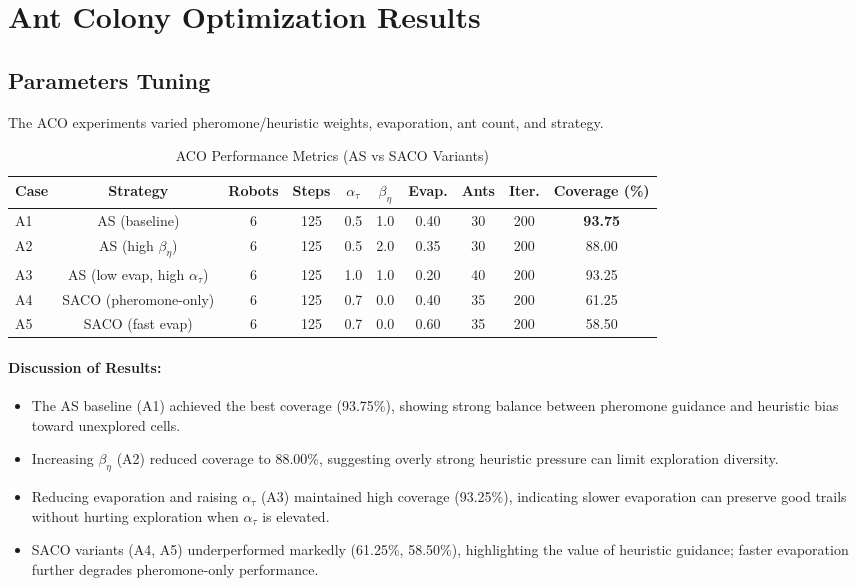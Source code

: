 \section{Ant Colony Optimization Results}

\subsection{Parameters Tuning}

The ACO experiments varied pheromone/heuristic weights, evaporation, ant count, and strategy. 

\begin{table}[H]
\centering
\caption{ACO Performance Metrics (AS vs SACO Variants)}
\begin{tabular}{@{}lccccccccc@{}}
\toprule
\textbf{Case} & \textbf{Strategy} & \textbf{Robots} & \textbf{Steps} & \textbf{$\alpha_{\tau}$} & \textbf{$\beta_{\eta}$} & \textbf{Evap.} & \textbf{Ants} & \textbf{Iter.} & \textbf{Coverage (\%)} \\
\midrule
A1 & AS (baseline) & 6 & 125 & 0.5 & 1.0 & 0.40 & 30 & 200 & \textbf{93.75} \\
A2 & AS (high $\beta_{\eta}$) & 6 & 125 & 0.5 & 2.0 & 0.35 & 30 & 200 & 88.00 \\
A3 & AS (low evap, high $\alpha_{\tau}$) & 6 & 125 & 1.0 & 1.0 & 0.20 & 40 & 200 & 93.25 \\
A4 & SACO (pheromone-only) & 6 & 125 & 0.7 & 0.0 & 0.40 & 35 & 200 & 61.25 \\
A5 & SACO (fast evap) & 6 & 125 & 0.7 & 0.0 & 0.60 & 35 & 200 & 58.50 \\
\bottomrule
\end{tabular}
\label{tab:aco_tuning}
\end{table}

\paragraph{Discussion of Results:}
\begin{itemize}
    \item The AS baseline (A1) achieved the best coverage (93.75\%), showing strong balance between pheromone guidance and heuristic bias toward unexplored cells.
    \item Increasing $\beta_{\eta}$ (A2) reduced coverage to 88.00\%, suggesting overly strong heuristic pressure can limit exploration diversity.
    \item Reducing evaporation and raising $\alpha_{\tau}$ (A3) maintained high coverage (93.25\%), indicating slower evaporation can preserve good trails without hurting exploration when $\alpha_{\tau}$ is elevated.
    \item SACO variants (A4, A5) underperformed markedly (61.25\%, 58.50\%), highlighting the value of heuristic guidance; faster evaporation further degrades pheromone-only performance.
\end{itemize}


